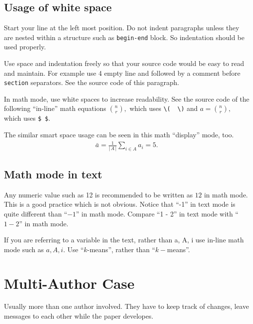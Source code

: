 \documentclass[pre,twocolumn,showkeys,longbibliography]{revtex4-1}
\newcommand{\hCode}[1]{\texttt{#1}}
\newcommand{\hAbs}[1]{\ensuremath{\left \lvert \, #1 \, \right \rvert} } %
\theoremstyle{plain}
\theoremstyle{definition}
\theoremstyle{remark}
\begin{document}
\subsection{Usage of white space}

Start your line at the left most position.
Do not indent paragraphs unless they are nested within a structure such as \hCode{begin-end} block.
So indentation should be used properly.

Use space and indentation freely so that your source code would be easy to read and maintain.
For example use 4 empty line and followed by a comment before \hCode{section} separators.
See the source code of this paragraph.

In math mode, 
use white spaces to increase readability.
See the source code of the following ``in-line'' math equations
\(
	\binom{n}{r},
\)
which uses \verb!\(  \)!
and
$
	a = {n \choose r},
$
which uses \verb!$ $!.

The similar smart space usage can be seen in this math ``display'' mode, too.
\begin{align}
	\bar{a} 
		= 
			\frac
				{1}
				{\hAbs{A}}
			\sum_{i \in A} 
				a_{i}
		= 5.
\end{align}




\subsection{Math mode in text}

Any numeric value such as 12 is recommended to be written as $12$ in math mode.
This is a good practice which is not obvious.
Notice that ``-1'' in text mode is quite different than ``$-1$'' in math mode.
Compare ``1 - 2'' in text mode with ``$1 - 2$'' in math mode.

If you are referring to a variable in the text,
rather than a, A, i
use in-line math mode such as $a, A, i$.
Use ``$k$-means'', rather than ``$k-$means''.




\section{Multi-Author Case}

Usually more than one author involved.
They have to keep track of changes, leave messages to each other
while the paper developes.
\end{document}
